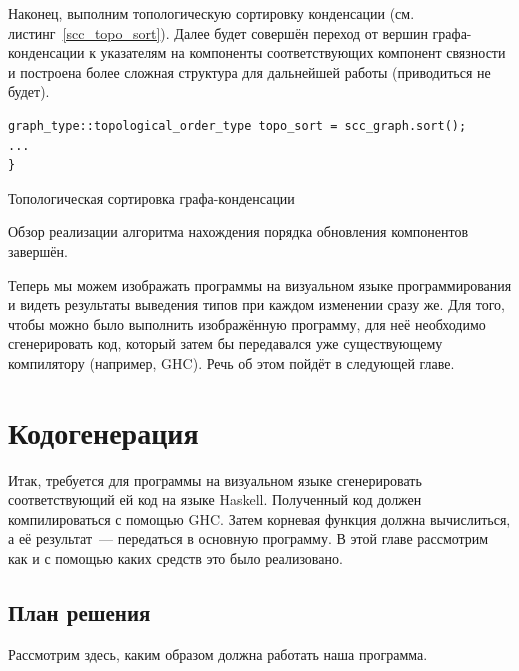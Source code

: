 Наконец, выполним топологическую сортировку конденсации (см. листинг~\ref{scc_topo_sort}). Далее будет совершён переход от вершин графа-конденсации к указателям на компоненты соответствующих компонент связности и построена более сложная структура для дальнейшей работы (приводиться не будет).

\begin{ListingEnv}[h]
	\begin{lstlisting}
graph_type::topological_order_type topo_sort = scc_graph.sort();
...
}
	\end{lstlisting}
	\caption{Топологическая сортировка графа-конденсации}\label{scc_topo_sort}
\end{ListingEnv}
Обзор реализации алгоритма нахождения порядка обновления компонентов завершён.

Теперь мы можем изображать программы на визуальном языке программирования и видеть результаты выведения типов при каждом изменении сразу же. Для того, чтобы можно было выполнить изображённую программу, для неё необходимо сгенерировать код, который затем бы передавался уже существующему компилятору (например, GHC). Речь об этом пойдёт в следующей главе.

\chapter{Кодогенерация}
Итак, требуется для программы на визуальном языке сгенерировать соответствующий ей код на языке Haskell. Полученный код должен компилироваться с помощью GHC. Затем корневая функция должна вычислиться, а её результат~--- передаться в основную программу. В этой главе рассмотрим как и с помощью каких средств это было реализовано.
\section{План решения}
Рассмотрим здесь, каким образом должна работать наша программа.

